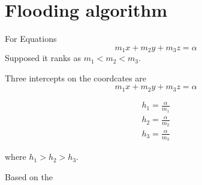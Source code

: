 \documentclass{article}
\begin{document}
\section{Flooding algorithm}
For Equations
\begin{equation}
  \label{eq:cut-1}
  m_{1}x+m_{2}y+m_{3}z = \alpha
\end{equation}
Supposed it ranks as $m_{1}<m_{2}<m_{3}$.

Three intercepts on the coordcates are
\begin{equation}
  \label{eq:cut-1}
  m_{1}x+m_{2}y+m_{3}z = \alpha
\end{equation}

\begin{equation}
  \begin{aligned}
  \label{eq:cut-1}
  h_{1} = \frac{\alpha}{m_{1}} \\
  h_{2} = \frac{\alpha}{m_{2}} \\
  h_{3} = \frac{\alpha}{m_{3}}
  \end{aligned}
\end{equation}

where $h_{1} > h_{2} > h_{3}$.

Based on the 
\end{document}
